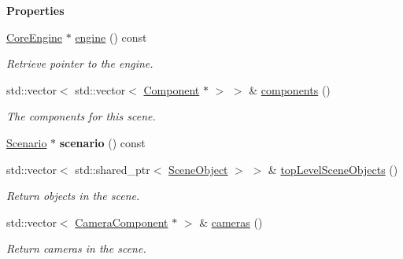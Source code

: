 \begin{Indent}\textbf{ Properties}\par
\begin{DoxyCompactItemize}
\item 
\mbox{\label{classrev_1_1_scene_afdede377110c092bafeb649e0b8469a8}} 
\mbox{\hyperlink{classrev_1_1_core_engine}{Core\+Engine}} $\ast$ \mbox{\hyperlink{classrev_1_1_scene_afdede377110c092bafeb649e0b8469a8}{engine}} () const
\begin{DoxyCompactList}\small\item\em Retrieve pointer to the engine. \end{DoxyCompactList}\item 
\mbox{\label{classrev_1_1_scene_aae02506bba76e87821a1b287c3d5c6ff}} 
std\+::vector$<$ std\+::vector$<$ \mbox{\hyperlink{classrev_1_1_component}{Component}} $\ast$ $>$ $>$ \& \mbox{\hyperlink{classrev_1_1_scene_aae02506bba76e87821a1b287c3d5c6ff}{components}} ()
\begin{DoxyCompactList}\small\item\em The components for this scene. \end{DoxyCompactList}\item 
\mbox{\label{classrev_1_1_scene_adf8c99a2415d7745cb9aa90ca6faee2d}} 
\mbox{\hyperlink{classrev_1_1_scenario}{Scenario}} $\ast$ {\bfseries scenario} () const
\item 
\mbox{\label{classrev_1_1_scene_a6efd182a0c738481cca83cd2f1567091}} 
std\+::vector$<$ std\+::shared\+\_\+ptr$<$ \mbox{\hyperlink{classrev_1_1_scene_object}{Scene\+Object}} $>$ $>$ \& \mbox{\hyperlink{classrev_1_1_scene_a6efd182a0c738481cca83cd2f1567091}{top\+Level\+Scene\+Objects}} ()
\begin{DoxyCompactList}\small\item\em Return objects in the scene. \end{DoxyCompactList}\item 
\mbox{\label{classrev_1_1_scene_a186ccbe8784c778e1070a86d05d69e79}} 
std\+::vector$<$ \mbox{\hyperlink{classrev_1_1_camera_component}{Camera\+Component}} $\ast$ $>$ \& \mbox{\hyperlink{classrev_1_1_scene_a186ccbe8784c778e1070a86d05d69e79}{cameras}} ()
\begin{DoxyCompactList}\small\item\em Return cameras in the scene. \end{DoxyCompactList}\item 

\end{DoxyCompactItemize}
\end{Indent}
